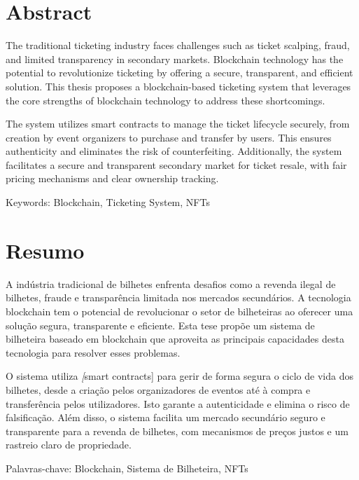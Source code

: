 \chapter*{Abstract}

The traditional ticketing industry faces challenges such as ticket scalping, fraud, and limited transparency in secondary markets. Blockchain technology has the potential to revolutionize ticketing by offering a secure, transparent, and efficient solution. This thesis proposes a blockchain-based ticketing system that leverages the core strengths of blockchain technology to address these shortcomings.

The system utilizes smart contracts to manage the ticket lifecycle securely, from creation by event organizers to purchase and transfer by users. This ensures authenticity and eliminates the risk of counterfeiting. Additionally, the system facilitates a secure and transparent secondary market for ticket resale, with fair pricing mechanisms and clear ownership tracking.

Keywords: Blockchain, Ticketing System, NFTs

\chapter*{Resumo}

A indústria tradicional de bilhetes enfrenta desafios como a revenda ilegal de bilhetes, fraude e transparência limitada nos mercados secundários. A tecnologia blockchain tem o potencial de revolucionar o setor de bilheteiras ao oferecer uma solução segura, transparente e eficiente. Esta tese propõe um sistema de bilheteira baseado em blockchain que aproveita as principais capacidades desta tecnologia para resolver esses problemas.

O sistema utiliza \textit[smart contracts] para gerir de forma segura o ciclo de vida dos bilhetes, desde a criação pelos organizadores de eventos até à compra e transferência pelos utilizadores. Isto garante a autenticidade e elimina o risco de falsificação. Além disso, o sistema facilita um mercado secundário seguro e transparente para a revenda de bilhetes, com mecanismos de preços justos e um rastreio claro de propriedade.

Palavras-chave: Blockchain, Sistema de Bilheteira, NFTs